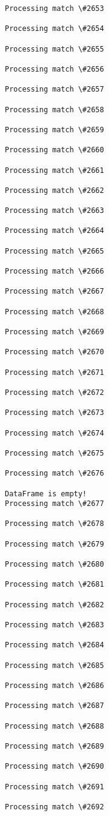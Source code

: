 \documentclass[11pt]{article}
\begin{document}
\begin{Verbatim}[commandchars=\\\{\}]
Processing match \#2653

Processing match \#2654

Processing match \#2655

Processing match \#2656

Processing match \#2657

Processing match \#2658

Processing match \#2659

Processing match \#2660

Processing match \#2661

Processing match \#2662

Processing match \#2663

Processing match \#2664

Processing match \#2665

Processing match \#2666

Processing match \#2667

Processing match \#2668

Processing match \#2669

Processing match \#2670

Processing match \#2671

Processing match \#2672

Processing match \#2673

Processing match \#2674

Processing match \#2675

Processing match \#2676

DataFrame is empty!
Processing match \#2677

Processing match \#2678

Processing match \#2679

Processing match \#2680

Processing match \#2681

Processing match \#2682

Processing match \#2683

Processing match \#2684

Processing match \#2685

Processing match \#2686

Processing match \#2687

Processing match \#2688

Processing match \#2689

Processing match \#2690

Processing match \#2691

Processing match \#2692


\end{Verbatim}
\end{document}
